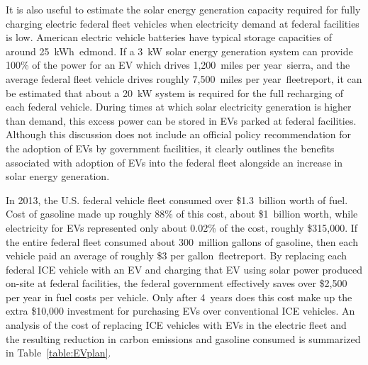 It is also useful to estimate the solar energy generation capacity required for fully charging electric federal fleet vehicles when electricity demand at federal facilities is low. American electric vehicle batteries have typical storage capacities of around 25~kWh~\cite{eric}{edmond}. If a 3~kW solar energy generation system can provide 100\% of the power for an EV which drives 1,200~miles per year~\cite{eric}{sierra}, and the average federal fleet vehicle drives roughly 7,500~miles per year~\cite{eric}{fleetreport}, it can be estimated that about a 20~kW system is required for the full recharging of each federal vehicle. During times at which solar electricity generation is higher than demand, this excess power can be stored in EVs parked at federal facilities. Although this discussion does not include an official policy recommendation for the adoption of EVs by government facilities, it clearly outlines the benefits associated with adoption of EVs into the federal fleet alongside an increase in solar energy generation. 


In 2013, the U.S. federal vehicle fleet consumed over \$1.3~billion worth of fuel. Cost of gasoline made up roughly 88\% of this cost, about \$1~billion worth, while electricity for EVs represented only about 0.02\% of the cost, roughly \$315,000. If the entire federal fleet consumed about 300~million gallons of gasoline, then each vehicle paid an average of roughly \$3 per gallon~\cite{eric}{fleetreport}. By replacing each federal ICE vehicle with an EV and charging that EV using solar power produced on-site at federal facilities, the federal government effectively saves over \$2,500 per year in fuel costs per vehicle. Only after 4~years does this cost make up the extra \$10,000 investment for purchasing EVs over conventional ICE vehicles. An analysis of the cost of replacing ICE vehicles with EVs in the electric fleet and the resulting reduction in carbon emissions and gasoline consumed is summarized in Table~\ref{table:EVplan}.




